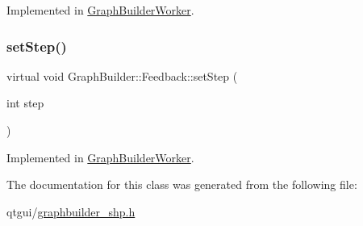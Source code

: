 Implemented in \mbox{\hyperlink{class_graph_builder_worker_a2205ca5c5a60a6e5e97153a4c69a1d76}{Graph\+Builder\+Worker}}.

\mbox{\label{class_graph_builder_1_1_feedback_a66a5931e6ddd5b54165125b39253f2ae}} 
\subsubsection{\texorpdfstring{setStep()}{setStep()}}
{\footnotesize\ttfamily virtual void Graph\+Builder\+::\+Feedback\+::set\+Step (\begin{DoxyParamCaption}\item[{int}]{step }\end{DoxyParamCaption})\hspace{0.3cm}{\ttfamily [pure virtual]}}



Implemented in \mbox{\hyperlink{class_graph_builder_worker_ab152daded1da5a91383b9ad1ef512a03}{Graph\+Builder\+Worker}}.



The documentation for this class was generated from the following file\+:\begin{DoxyCompactItemize}
\item 
qtgui/\mbox{\hyperlink{graphbuilder__shp_8h}{graphbuilder\+\_\+shp.\+h}}\end{DoxyCompactItemize}
